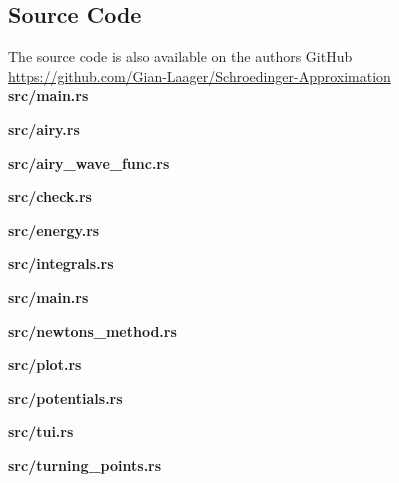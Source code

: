 \documentclass[11pt,DIV=10,final]{scrreprt} %
\begin{document}
\begin{appendix}
\chapter{Source Code}
The source code is also available on the authors GitHub \\
\url{https://github.com/Gian-Laager/Schroedinger-Approximation}\\[3ex]

{\noindent \large \bfseries src/main.rs}


\vspace*{3ex}
{\noindent \large \bfseries src/airy.rs}


\vspace*{3ex}
{\noindent \large \bfseries src/airy\_wave\_func.rs}


\vspace*{3ex}
{\noindent \large \bfseries src/check.rs}


\vspace*{3ex}
{\noindent \large \bfseries src/energy.rs}


\vspace*{3ex}
{\noindent \large \bfseries src/integrals.rs}


\vspace*{3ex}
{\noindent \large \bfseries src/main.rs}


\vspace*{3ex}
{\noindent \large \bfseries src/newtons\_method.rs}


\vspace*{3ex}
{\noindent \large \bfseries src/plot.rs}


\vspace*{3ex}
{\noindent \large \bfseries src/potentials.rs}


\vspace*{3ex}
{\noindent \large \bfseries src/tui.rs}


\vspace*{3ex}
{\noindent \large \bfseries src/turning\_points.rs}



\end{appendix}
\end{document}
